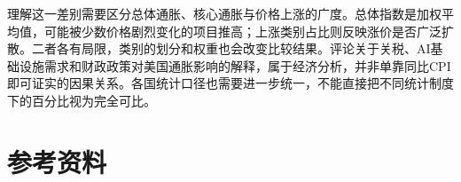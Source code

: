 \documentclass[10pt]{article}
\begin{document}
\begin{documents}
{理解这一差别需要区分总体通胀、核心通胀与价格上涨的广度。总体指数是加权平均值，可能被少数价格剧烈变化的项目推高；上涨类别占比则反映涨价是否广泛扩散。二者各有局限，类别的划分和权重也会改变比较结果。评论关于关税、AI基础设施需求和财政政策对美国通胀影响的解释，属于经济分析，并非单靠同比CPI即可证实的因果关系。各国统计口径也需要进一步统一，不能直接把不同统计制度下的百分比视为完全可比。}
\end{documents}
\small\section*{参考资料}


\end{document}
